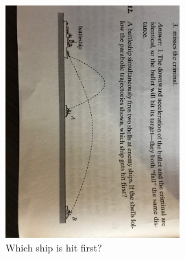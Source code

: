 \documentclass[10pt]{article}
\begin{document}
\begin{enumerate}
\begin{figure}[hb]
\includegraphics[width=0.6\textwidth,trim=0cm 30cm 0cm 45cm,clip=true]{battle.jpeg}
\caption{\label{fig:battle} Which ship is hit first?}
\end{figure}
\end{enumerate}
\end{document}
